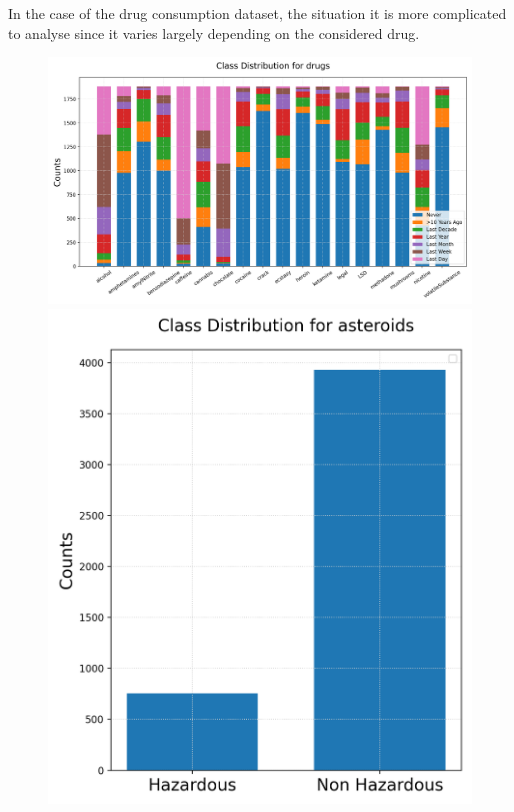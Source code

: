 \documentclass{article}
\begin{document}
In the case of the drug consumption dataset, the situation it is more complicated to analyse since it varies largely depending on the considered drug.

\begin{figure}[h!]
	\centering
	\begin{minipage}[b]{0.99\textwidth}
		\includegraphics[width=\textwidth]{Plots/Inbalance_drugs.png}
	\end{minipage}
	\begin{minipage}[b]{0.32\textwidth}
	\includegraphics[width=\textwidth]{Plots/Inbalance_asteroids.png}

\end{minipage}
\end{figure}
\end{document}
